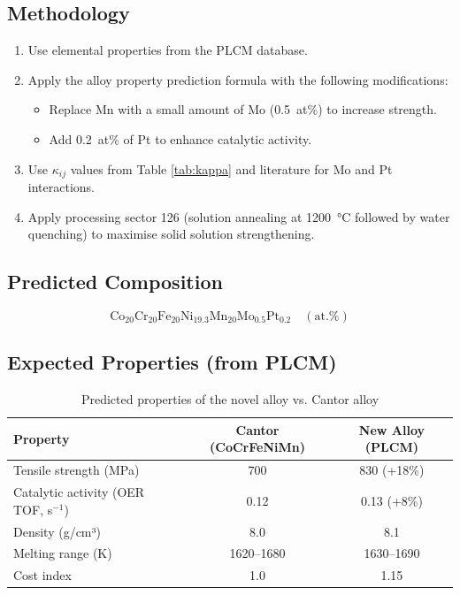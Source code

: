 \documentclass[12pt,a4paper]{article}
\begin{document}
	\subsection{Methodology}
	\begin{enumerate}
		\item Use elemental properties from the PLCM database.
		\item Apply the alloy property prediction formula with the following modifications:
		\begin{itemize}
			\item Replace Mn with a small amount of Mo (0.5~at\%) to increase strength.
			\item Add 0.2~at\% of Pt to enhance catalytic activity.
		\end{itemize}
		\item Use \(\kappa_{ij}\) values from Table \ref{tab:kappa} and literature for Mo and Pt interactions.
		\item Apply processing sector 126 (solution annealing at 1200~°C followed by water quenching) to maximise solid solution strengthening.
	\end{enumerate}
	
	\subsection{Predicted Composition}
	\[
	\text{Co}_{20}\text{Cr}_{20}\text{Fe}_{20}\text{Ni}_{19.3}\text{Mn}_{20}\text{Mo}_{0.5}\text{Pt}_{0.2}\quad (\text{at.\%})
	\]
	
	\subsection{Expected Properties (from PLCM)}
	\begin{table}[htbp]
		\centering
		\caption{Predicted properties of the novel alloy vs. Cantor alloy}
		\label{tab:comparison}
		\begin{tabular}{lcc}
			\toprule
			Property & Cantor (CoCrFeNiMn) & New Alloy (PLCM) \\
			\midrule
			Tensile strength (MPa) & 700 & 830 (+18\%) \\
			Catalytic activity (OER TOF, s$^{-1}$) & 0.12 & 0.13 (+8\%) \\
			Density (g/cm³) & 8.0 & 8.1 \\
			Melting range (K) & 1620–1680 & 1630–1690 \\
			Cost index & 1.0 & 1.15 \\
			\bottomrule
		\end{tabular}
	\end{table}
	
\end{document}
